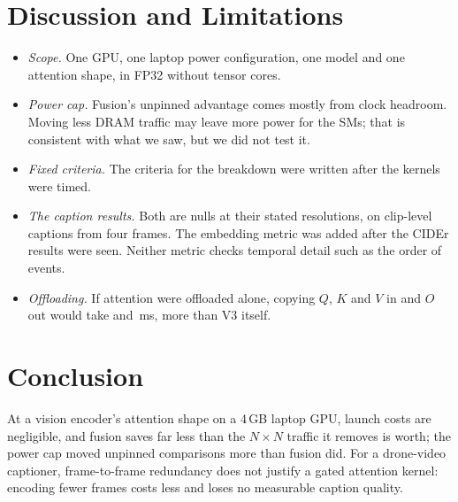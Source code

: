 \documentclass[conference]{IEEEtran}
\newcommand{\NxN}{$N\times N$}
\begin{document}
\section{Discussion and Limitations}
\begin{itemize}
\item \textit{Scope.} One GPU, one laptop power configuration, one model and one attention shape, in FP32
without tensor cores.
\item \textit{Power cap.} Fusion's unpinned advantage comes mostly from clock headroom. Moving less DRAM
traffic may leave more power for the SMs; that is consistent with what we saw, but we did not test it.
\item \textit{Fixed criteria.} The criteria for the breakdown were written after the kernels were timed.
\item \textit{The caption results.} Both are nulls at their stated resolutions, on clip-level captions from
four frames. The embedding metric was added after the CIDEr results were seen. Neither metric checks temporal
detail such as the order of events.
\item \textit{Offloading.} If attention were offloaded alone, copying $Q$, $K$ and $V$ in and $O$ out would take
\CopyInMs{} and \CopyOutMs\,ms, more than V3 itself.
\end{itemize}

\section{Conclusion}
At a vision encoder's attention shape on a 4\,GB laptop GPU, launch costs are negligible, and fusion saves far
less than the \NxN{} traffic it removes is worth; the power cap moved unpinned comparisons more than fusion did.
For a drone-video captioner, frame-to-frame redundancy does not justify a gated attention kernel: encoding fewer
frames costs less and loses no measurable caption quality.



\end{document}
